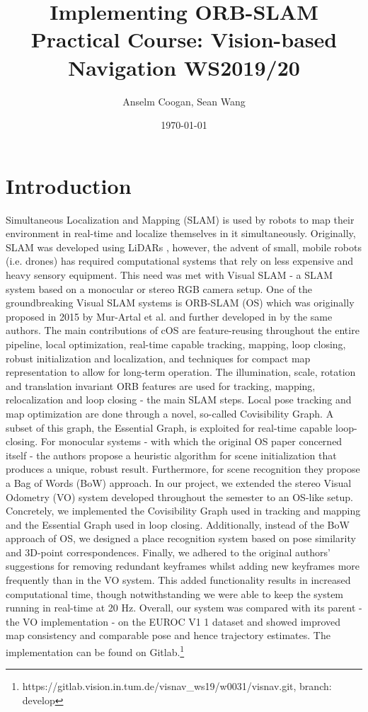 \documentclass[a4paper, 10pt]{article}
\author{Anselm Coogan, Sean Wang}
\date{\today}
\title{Implementing ORB-SLAM\\\medskip
\large Practical Course: Vision-based Navigation WS2019/20}
\begin{document}
\maketitle

\section{Introduction}
\label{sec:org2a0ceaa}
Simultaneous Localization and Mapping (SLAM) is used by robots to map their environment in real-time and localize themselves in it simultaneously.
Originally, SLAM was developed using LiDARs \cite{slam}, however, the advent of small, mobile robots (i.e. drones) has required computational systems that rely on less expensive and heavy sensory equipment. 
This need was met with Visual SLAM - a SLAM system based on a monocular or stereo RGB camera setup.
One of the groundbreaking Visual SLAM systems is ORB-SLAM (OS) which was originally proposed in 2015 by Mur-Artal et al. \cite{os} and further developed in \cite{os-II} by the same authors.
The main contributions of cOS are feature-reusing throughout the entire pipeline, local optimization, real-time capable tracking, mapping, loop closing, robust initialization and localization, and techniques for compact map representation to allow for long-term operation. 
The illumination, scale, rotation and translation invariant ORB features\cite{orb} are used for tracking, mapping, relocalization and loop closing - the main SLAM steps. 
Local pose tracking and map optimization are done through a novel, so-called Covisibility Graph. A subset of this graph, the Essential Graph, is exploited for real-time capable loop-closing. 
For monocular systems - with which the original OS paper concerned itself - the authors propose a heuristic algorithm for scene initialization that produces a unique, robust result. 
Furthermore, for scene recognition they propose a Bag of Words (BoW) \cite{bow} approach.
In our project, we extended the stereo Visual Odometry (VO) system developed throughout the semester to an OS-like setup. 
Concretely, we implemented the Covisibility Graph used in tracking and mapping and the Essential Graph used in loop closing. 
Additionally, instead of the BoW approach of OS, we designed a place recognition system based on pose similarity and 3D-point correspondences. 
Finally, we adhered to the original authors’ suggestions for removing redundant keyframes whilst adding new keyframes more frequently than in the VO system. 
This added functionality results in increased computational time, though notwithstanding we were able to keep the system running in real-time at 20 Hz. 
Overall, our system was compared with its parent - the VO implementation - on the EUROC V1 1 dataset \cite{euroc} and showed improved map consistency and comparable pose and hence trajectory estimates. 
The implementation can be found on Gitlab.\footnote{https://gitlab.vision.in.tum.de/visnav\_ws19/w0031/visnav.git, branch: develop}
\end{document}
